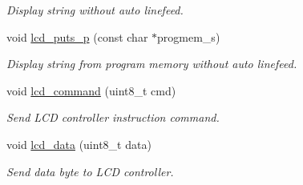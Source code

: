 \begin{DoxyCompactItemize}
\begin{DoxyCompactList}\small\item\em Display string without auto linefeed. \end{DoxyCompactList}\item 
void \hyperlink{a00006_ga9022a24a56a9b15681f62eb6ba77e5de}{lcd\+\_\+puts\+\_\+p} (const char $\ast$progmem\+\_\+s)
\begin{DoxyCompactList}\small\item\em Display string from program memory without auto linefeed. \end{DoxyCompactList}\item 
void \hyperlink{a00006_gaea9d14f02df06f948cb5a56776980826}{lcd\+\_\+command} (uint8\+\_\+t cmd)
\begin{DoxyCompactList}\small\item\em Send L\+CD controller instruction command. \end{DoxyCompactList}\item 
void \hyperlink{a00006_gad0729d2cba627825a089ca1fff12ba29}{lcd\+\_\+data} (uint8\+\_\+t data)
\begin{DoxyCompactList}\small\item\em Send data byte to L\+CD controller. \end{DoxyCompactList}\end{DoxyCompactItemize}
